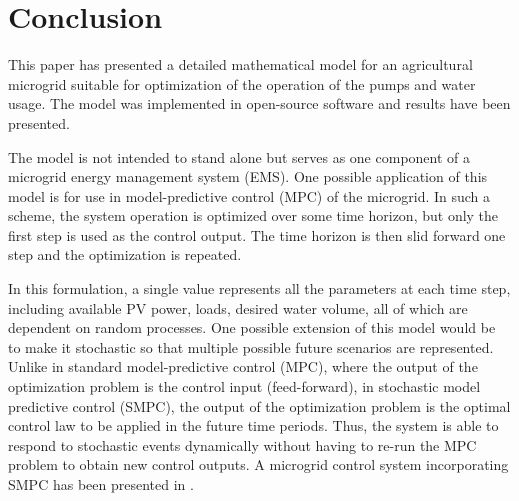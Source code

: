 \section{Conclusion}
\label{sec:conclusion}

This paper has presented a detailed mathematical model for an agricultural microgrid suitable for optimization of the operation of the pumps and water usage. The model was implemented in open-source software and results have been presented.

The model is not intended to stand alone but serves as one component of a microgrid energy management system (EMS).
One possible application of this model is for use in model-predictive control (MPC) of the microgrid.
In such a scheme, the system operation is optimized over some time horizon, but only the first step is used as the control output.
The time horizon is then slid forward one step and the optimization is repeated.

In this formulation, a single value represents all the parameters at each time step, including available PV power, loads, desired water volume, all of which are dependent on random processes.
One possible extension of this model would be to make it stochastic so that multiple possible future scenarios are represented.
Unlike in standard model-predictive control (MPC), where the output of the optimization problem is the control input (feed-forward), in stochastic model predictive control (SMPC), the output of the optimization problem is the optimal control law to be applied in the future time periods\cite{mesbah2016}. Thus, the system is able to respond to stochastic events dynamically without having to re-run the MPC problem to obtain new control outputs.
A microgrid control system incorporating SMPC has been presented in \cite{cominesi2015}.